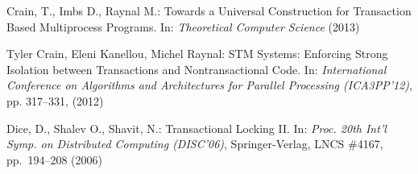 \documentclass[runningheads,a4paper]{llncs}
\begin{document}
 
 \begin{thebibliography}{4}
  
  
Crain, T., Imbs D., Raynal M.:
Towards a Universal Construction for
Transaction Based Multiprocess Programs.
In: {\it Theoretical Computer Science} (2013)


Tyler Crain, Eleni Kanellou, Michel Raynal:
STM Systems: Enforcing Strong Isolation between Transactions and Nontransactional Code.
In: {\it International Conference on Algorithms and
Architectures for Parallel Processing (ICA3PP'12)}, pp. 317--331, (2012)


Dice, D., Shalev O., Shavit, N.:
Transactional Locking II.
In: {\em Proc. 20th Int'l Symp. on Distributed Computing (DISC'06)},
Springer-Verlag, LNCS \#4167, pp.~194--208 (2006)
  
  
  
 \end{thebibliography}

 
 
\end{document}

